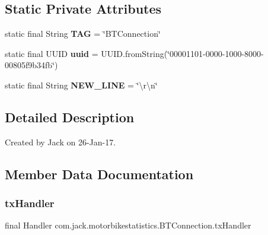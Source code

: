 \subsection*{Static Private Attributes}
\begin{DoxyCompactItemize}
\item 
\mbox{\label{classcom_1_1jack_1_1motorbikestatistics_1_1_b_t_connection_af9455991fec4de29ffc875eae117a761}} 
static final String {\bfseries T\+AG} = \char`\"{}B\+T\+Connection\char`\"{}
\item 
\mbox{\label{classcom_1_1jack_1_1motorbikestatistics_1_1_b_t_connection_a6551312055376866c73f11721a45e26c}} 
static final U\+U\+ID {\bfseries uuid} = U\+U\+I\+D.\+from\+String(\char`\"{}00001101-\/0000-\/1000-\/8000-\/00805f9b34fb\char`\"{})
\item 
\mbox{\label{classcom_1_1jack_1_1motorbikestatistics_1_1_b_t_connection_aacec2fadb24352fd7fdeae731e3ed412}} 
static final String {\bfseries N\+E\+W\+\_\+\+L\+I\+NE} = \char`\"{}\textbackslash{}r\textbackslash{}n\char`\"{}
\end{DoxyCompactItemize}


\subsection{Detailed Description}
Created by Jack on 26-\/\+Jan-\/17. 

\subsection{Member Data Documentation}
\mbox{\label{classcom_1_1jack_1_1motorbikestatistics_1_1_b_t_connection_a7a88b2007af6a9a5c8667a9f1df980cc}} 
\subsubsection{\texorpdfstring{tx\+Handler}{txHandler}}
{\footnotesize\ttfamily final Handler com.\+jack.\+motorbikestatistics.\+B\+T\+Connection.\+tx\+Handler}

